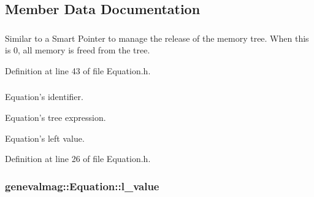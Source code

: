 \subsection{Member Data Documentation}
\hypertarget{classgenevalmag_1_1Equation_a96ea50e0ed15373e6246fd00d8c79ac4}{
\subsubsection[{count\_\-ref}]{}}
\label{classgenevalmag_1_1Equation_a96ea50e0ed15373e6246fd00d8c79ac4}


Similar to a Smart Pointer to manage the release of the memory tree. When this is 0, all memory is freed from the tree. 



Definition at line 43 of file Equation.h.

\hypertarget{classgenevalmag_1_1Equation_abcf149aeb80efa3ccb5c41886570e215}{
\subsubsection[{eq\_\-id}]{}}
\label{classgenevalmag_1_1Equation_abcf149aeb80efa3ccb5c41886570e215}


Equation's identifier. 

Equation's tree expression.

Equation's left value. 

Definition at line 26 of file Equation.h.

\hypertarget{classgenevalmag_1_1Equation_af6dfdfddb6eff2b61a359ff5d58c5144}{
\subsubsection[{l\_\-value}]{ {\bf genevalmag::Equation::l\_\-value}}}
\label{classgenevalmag_1_1Equation_af6dfdfddb6eff2b61a359ff5d58c5144}


